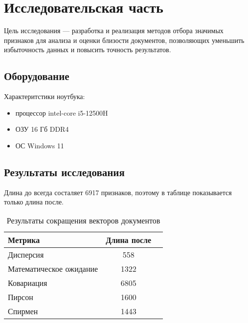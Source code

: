 \chapter{Исследовательская часть}

Цель исследования — разработка и реализация методов отбора значимых признаков для анализа и оценки близости документов, 
позволяющих уменьшить избыточность данных и повысить точность результатов.

\section{Оборудование}

Характеритстики ноутбука:
\begin{itemize}
	\item процессор intel-core i5-12500H \cite{lib:intel}
	\item ОЗУ 16 Гб DDR4
	\item ОС Windows 11 \cite{lib:windows}
\end{itemize}

\section{Результаты исследования}

Длина до всегда состаляет 6917 признаков, поэтому в таблице показывается только длина после.
\begin{table}[H]
    \centering
    \begin{tabular}{|l|c|c|}
    \hline
    \textbf{Метрика}                                  & \textbf{Длина после}             \\ \hline
    Дисперсия                                         & 558                              \\ \hline
    Математическое ожидание                           & 1322                             \\ \hline
    Ковариация                                        & 6805                             \\ \hline
    Пирсон                                            & 1600                             \\ \hline
    Спирмен                                           & 1443                             \\ \hline
    \end{tabular}
    \caption{Результаты сокращения векторов документов}
    \label{tab:similarity}
\end{table}

